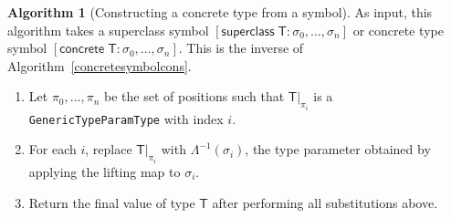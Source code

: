 \documentclass[a4paper,headsepline,bibliography=totoc,toc=flat,fleqn,twoside=semi]{scrbook}
\theoremstyle{definition}
\theoremstyle{definition}
\theoremstyle{definition}
\newtheorem{algorithm}{Algorithm}[chapter]
\newcommand{\namesym}[1]{\mathsf{#1}}
\newcommand{\supersym}[1]{[\mathsf{superclass}\;#1]}
\newcommand{\concretesym}[1]{[\mathsf{concrete}\;#1]}
\begin{document}
\begin{algorithm}[Constructing a concrete type from a symbol]\label{symboltotype} As input, this algorithm takes a
superclass symbol $\supersym{\namesym{T}\colon\sigma_0,\ldots,\sigma_n}$ or
concrete type symbol $\concretesym{\namesym{T}\colon\sigma_0,\ldots,\sigma_n}$. This is the inverse of Algorithm~\ref{concretesymbolcons}.

\begin{enumerate}
\item Let $\pi_0,\ldots,\pi_n$ be the set of positions such that $\namesym{T}|_{\pi_i}$ is a
\texttt{GenericTypeParamType} with index $i$.
\item For each $i$, replace $\namesym{T}|_{\pi_i}$ with $\Lambda^{-1}(\sigma_i)$, the type
parameter obtained by applying the lifting map to $\sigma_i$.
\item Return the final value of type $\namesym{T}$ after performing all substitutions above.
\end{enumerate}
\end{algorithm}
\end{document}
